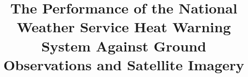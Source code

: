 \documentclass{ametsoc}
\title{The Performance of the National Weather Service Heat Warning System Against Ground Observations and Satellite Imagery}
\affiliation{Nelson Institute for Environmental Studies, University of Wisconsin-Madison}
\begin{document}
\maketitle{}

%






\end{document}
